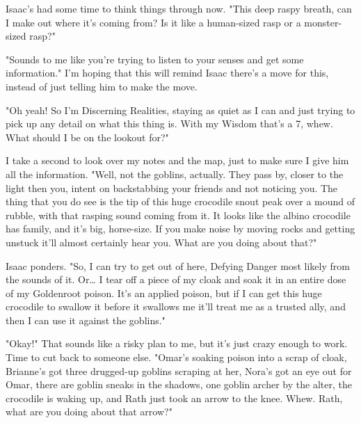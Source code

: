  

Isaac's had some time to think things through now. "This deep raspy breath, can I make out where it's coming from? Is it like a human-sized rasp or a monster-sized rasp?"

 

"Sounds to me like you're trying to listen to your senses and get some information." I'm hoping that this will remind Isaac there's a move for this, instead of just telling him to make the move.

 

"Oh yeah! So I'm Discerning Realities, staying as quiet as I can and just trying to pick up any detail on what this thing is. With my Wisdom that's a 7, whew. What should I be on the lookout for?"

 

I take a second to look over my notes and the map, just to make sure I give him all the information. "Well, not the goblins, actually. They pass by, closer to the light then you, intent on backstabbing your friends and not noticing you. The thing that you do see is the tip of this huge crocodile snout peak over a mound of rubble, with that rasping sound coming from it. It looks like the albino crocodile has family, and it's big, horse-size. If you make noise by moving rocks and getting unstuck it'll almost certainly hear you. What are you doing about that?"

 

Isaac ponders. "So, I can try to get out of here, Defying Danger most likely from the sounds of it. Or… I tear off a piece of my cloak and soak it in an entire dose of my Goldenroot poison. It's an applied poison, but if I can get this huge crocodile to swallow it before it swallows me it'll treat me as a trusted ally, and then I can use it against the goblins."

 

"Okay!" That sounds like a risky plan to me, but it's just crazy enough to work. Time to cut back to someone else. "Omar's soaking poison into a scrap of cloak, Brianne's got three drugged-up goblins scraping at her, Nora's got an eye out for Omar, there are goblin sneaks in the shadows, one goblin archer by the alter, the crocodile is waking up, and Rath just took an arrow to the knee. Whew. Rath, what are you doing about that arrow?"








